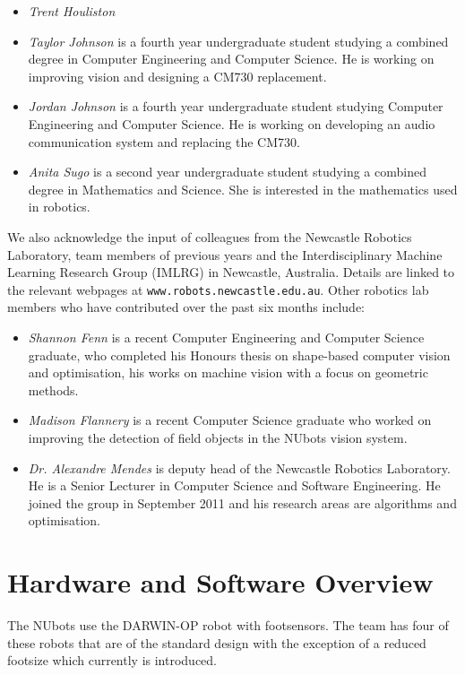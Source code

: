\documentclass{llncs}
\begin{document}
\begin{itemize}
\item \emph{Trent Houliston} 

\item \emph{Taylor Johnson} is a fourth year undergraduate student studying a combined degree in Computer Engineering and Computer Science. He is working on improving vision and designing a CM730 replacement.

\item \emph{Jordan Johnson} is a fourth year undergraduate student studying Computer Engineering and Computer Science. He is working on developing an audio communication system and replacing the CM730.

\item \emph{Anita Sugo} is a second year undergraduate student studying a combined degree in Mathematics and Science. She is interested in the mathematics used in robotics.

\end{itemize}

We also acknowledge the input of colleagues from the Newcastle Robotics Laboratory, team members of previous years
and the Interdisciplinary Machine Learning Research Group (IMLRG) in
Newcastle, Australia. Details are linked to the relevant webpages at
\texttt{www.robots.newcastle.edu.au}. Other robotics lab members who have contributed over the past six months include:
\begin{itemize}

\item \emph{Shannon Fenn} is a recent Computer Engineering and Computer Science graduate, who completed his Honours thesis on shape-based computer vision and optimisation, his works on machine vision with a focus on geometric methods.

\item \emph{Madison Flannery} is a recent Computer Science graduate who worked on improving the detection of field objects in the NUbots vision system.

\item \emph{Dr. Alexandre Mendes} is deputy head of the Newcastle Robotics
Laboratory. He is a Senior Lecturer in Computer Science and Software Engineering.
He joined the group in September 2011 and his research areas are algorithms and optimisation.

\end{itemize}



\section{Hardware and Software Overview}
The NUbots use the DARWIN-OP robot with footsensors. The team has four of these robots that are of the standard design with the exception of a reduced footsize which currently is introduced. %
\end{document}
